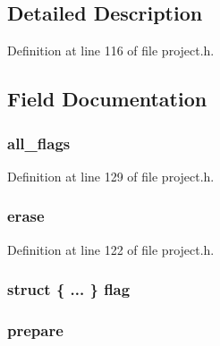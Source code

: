 \subsection{\-Detailed \-Description}


\-Definition at line 116 of file project.\-h.



\subsection{\-Field \-Documentation}
\hypertarget{unions__message__flags_abf876e68df8575f02084e137cc49266b}{
\subsubsection[{all\-\_\-flags}]{ {\bf all\-\_\-flags}}}\label{unions__message__flags_abf876e68df8575f02084e137cc49266b}


\-Definition at line 129 of file project.\-h.

\hypertarget{unions__message__flags_ada1ae3495f53243e7b5e0c42b23ea23e}{
\subsubsection[{erase}]{ {\bf erase}}}\label{unions__message__flags_ada1ae3495f53243e7b5e0c42b23ea23e}


\-Definition at line 122 of file project.\-h.

\hypertarget{unions__message__flags_afab2973bf2fba71ed2d5fced86bc2598}{
\subsubsection[{flag}]{\setlength{\rightskip}{0pt plus 5cm}struct \{ ... \}   {\bf flag}}}\label{unions__message__flags_afab2973bf2fba71ed2d5fced86bc2598}
\hypertarget{unions__message__flags_ac9fd816d2574fa72f3fbde01b771ed61}{
\subsubsection[{prepare}]{ {\bf prepare}}}\label{unions__message__flags_ac9fd816d2574fa72f3fbde01b771ed61}



